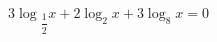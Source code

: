 \begin{ex}[type=equation]
	\begin{condition}
		$3\log$\tiny$_{\dfrac{1}{2}}$\normalsize$ x + 2\log_2 x + 3\log_8 x = 0$
	\end{condition}
\end{ex}